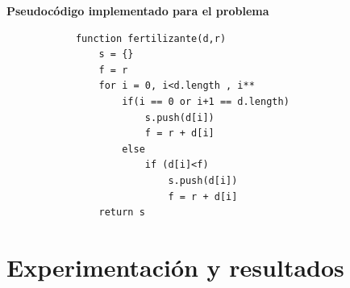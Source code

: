 \documentclass{article}
\begin{document}
    \newpage
 
    \textbf{Pseudocódigo implementado para el problema}
        \begin{verbatim}
            function fertilizante(d,r)
                s = {}
                f = r
                for i = 0, i<d.length , i**
                    if(i == 0 or i+1 == d.length) 
                        s.push(d[i])
                        f = r + d[i]
                    else
                        if (d[i]<f)
                            s.push(d[i])
                            f = r + d[i]
                return s
        \end{verbatim}
        \newpage
\section{Experimentación y resultados}
\end{document}

